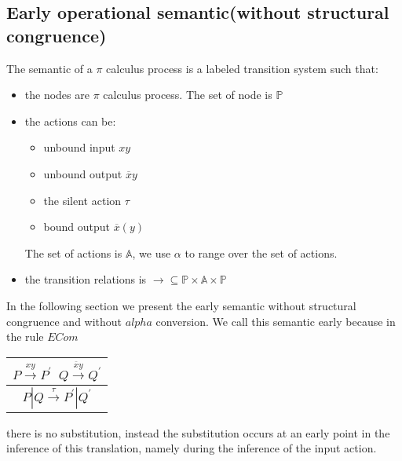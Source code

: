 \subsection{Early operational semantic(without structural congruence)}
The semantic of a $\pi$ calculus process is a labeled transition system such that:
\begin{itemize}
  \item 
    the nodes are $\pi$ calculus process. The set of node is $\mathbb{P}$
  \item
    the actions can be:
    \begin{itemize}
      \item unbound input $xy$
      \item unbound output $\overline{x}y$
      \item the silent action $\tau$
      \item bound output $\overline{x}(y)$
    \end{itemize}
    The set of actions is $\mathbb{A}$, we use $\alpha$ to range over the set of actions.
  \item
    the transition relations is $\rightarrow\subseteq \mathbb{P}\times \mathbb{A}\times \mathbb{P}$
\end{itemize}
In the following section we present the early semantic without structural congruence and without $alpha$ conversion. We call this semantic early because in the rule $ECom$
\begin{center}
  \begin{tabular}{c}
    $P \xrightarrow{xy} P^{'}\;\; Q\xrightarrow{\overline{x}y} Q^{'}$\\
    \hline
    $P|Q \xrightarrow{\tau} P^{'}|Q^{'}$
  \end{tabular}
\end{center}
there is no substitution, instead the substitution occurs at an early point in the inference of this translation, namely during the inference of the input action. 

